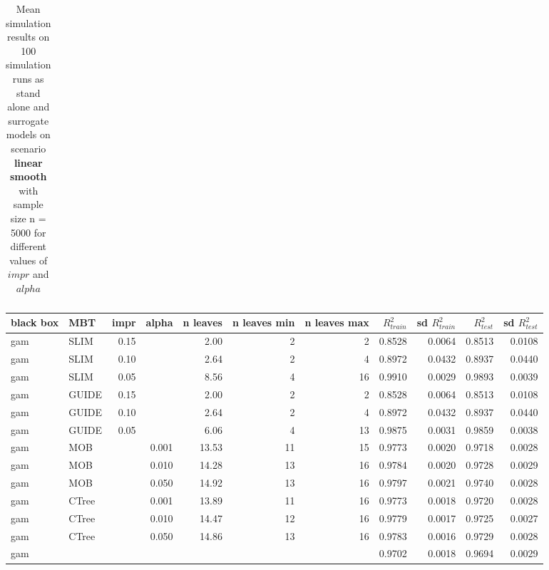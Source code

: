 \begin{table}[!htb]
\begin{tabular}[t]{l|l|r|r|r|r|r|r|r|r|r}
\hline
\end{tabular}
\caption{Mean simulation results on 100 simulation runs as stand alone and surrogate models on scenario \textbf{linear smooth} with sample size n = 5000 for different values of $impr$ and $alpha$}
\label{tab:app_linear_smooth_5000}

\end{table}



\begin{table}[!htb]

\centering \tiny
\begin{tabular}[t]{l|l|r|r|r|r|r|r|r|r|r}
\hline
black box & MBT & impr & alpha & n leaves & n leaves min & n leaves max &  $R^2_{train}$ & sd $R^2_{train}$ & $R^2_{test}$ & sd $R^2_{test}$\\
\hline
gam & SLIM & 0.15 & & 2.00 & 2 & 2 & 0.8528 & 0.0064 & 0.8513 & 0.0108\\
gam & SLIM & 0.10 & & 2.64 & 2 & 4 & 0.8972 & 0.0432 & 0.8937 & 0.0440\\
gam & SLIM & 0.05 & & 8.56 & 4 & 16 & 0.9910 & 0.0029 & 0.9893 & 0.0039\\
gam & GUIDE & 0.15 & & 2.00 & 2 & 2 & 0.8528 & 0.0064 & 0.8513 & 0.0108\\
gam & GUIDE & 0.10 & & 2.64 & 2 & 4 & 0.8972 & 0.0432 & 0.8937 & 0.0440\\
gam & GUIDE & 0.05 & & 6.06 & 4 & 13 & 0.9875 & 0.0031 & 0.9859 & 0.0038\\
gam & MOB & & 0.001 & 13.53 & 11 & 15 & 0.9773 & 0.0020 & 0.9718 & 0.0028\\
gam & MOB & & 0.010 & 14.28 & 13 & 16 & 0.9784 & 0.0020 & 0.9728 & 0.0029\\
gam & MOB & & 0.050 & 14.92 & 13 & 16 & 0.9797 & 0.0021 & 0.9740 & 0.0028\\
gam & CTree & & 0.001 & 13.89 & 11 & 16 & 0.9773 & 0.0018 & 0.9720 & 0.0028\\
gam & CTree & & 0.010 & 14.47 & 12 & 16 & 0.9779 & 0.0017 & 0.9725 & 0.0027\\
gam & CTree & & 0.050 & 14.86 & 13 & 16 & 0.9783 & 0.0016 & 0.9729 & 0.0028\\
\hline
gam & & & & & & & 0.9702 & 0.0018 & 0.9694 & 0.0029\\
\hline


\end{tabular}
\end{table}
